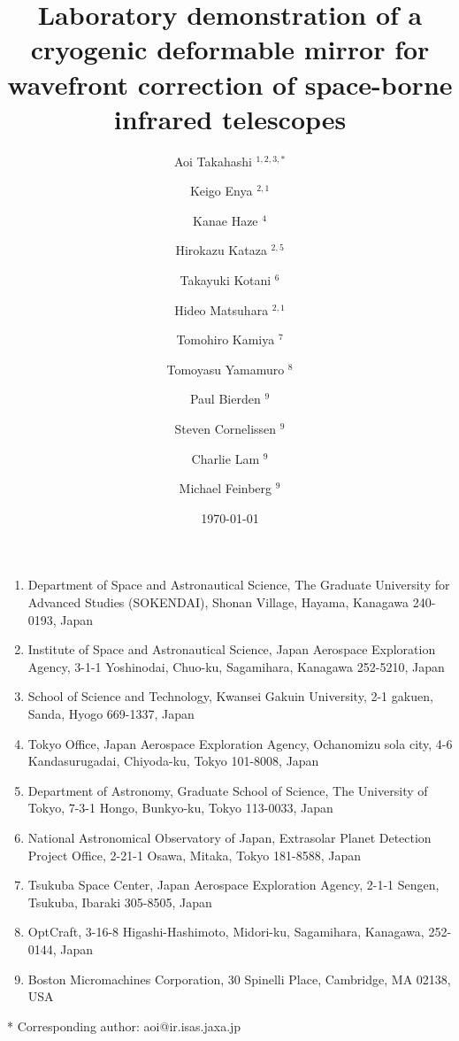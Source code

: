 \documentclass[a4paper]{article}
\begin{document}
\begin{titlepage}

\title{Laboratory demonstration of a cryogenic deformable mirror for wavefront correction of space-borne infrared telescopes}

\author{Aoi Takahashi $^{1,2,3,*}$ \and Keigo Enya $^{2,1}$ \and Kanae Haze $^{4}$ \and Hirokazu Kataza $^{2,5}$ \and Takayuki Kotani $^{6}$ \and Hideo Matsuhara $^{2,1}$ \and Tomohiro Kamiya $^{7}$ \and Tomoyasu Yamamuro $^{8}$ \and Paul Bierden $^{9}$ \and Steven Cornelissen $^{9}$ \and Charlie Lam $^{9}$ \and Michael Feinberg $^{9}$}

\date{\today}
\maketitle

{\small {\sl
\begin{enumerate}
\item Department of Space and Astronautical Science, The Graduate University for Advanced Studies (SOKENDAI), Shonan Village, Hayama, Kanagawa 240-0193, Japan
\item Institute of Space and Astronautical Science, Japan Aerospace Exploration Agency, 3-1-1 Yoshinodai, Chuo-ku, Sagamihara, Kanagawa 252-5210, Japan
\item School of Science and Technology, Kwansei Gakuin University, 2-1 gakuen, Sanda, Hyogo 669-1337, Japan
\item Tokyo Office, Japan Aerospace Exploration Agency, Ochanomizu sola city, 4-6 Kandasurugadai, Chiyoda-ku, Tokyo 101-8008, Japan
\item Department of Astronomy, Graduate School of Science, The University of Tokyo, 7-3-1 Hongo, Bunkyo-ku, Tokyo 113-0033, Japan
\item National Astronomical Observatory of Japan, Extrasolar Planet Detection Project Office, 2-21-1 Osawa, Mitaka, Tokyo 181-8588, Japan
\item Tsukuba Space Center, Japan Aerospace Exploration Agency, 2-1-1 Sengen, Tsukuba, Ibaraki 305-8505, Japan
\item OptCraft, 3-16-8 Higashi-Hashimoto, Midori-ku, Sagamihara, Kanagawa, 252-0144, Japan
\item Boston Micromachines Corporation, 30 Spinelli Place, Cambridge, MA 02138, USA
\end{enumerate}
* Corresponding author: aoi@ir.isas.jaxa.jp
}}\\


\end{titlepage}
\end{document}
